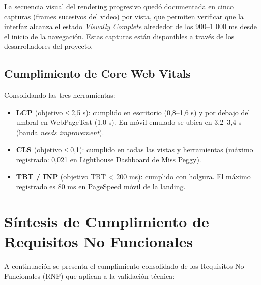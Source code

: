 La secuencia visual del rendering progresivo quedó documentada en cinco capturas (frames sucesivos del video) por vista, que permiten verificar que la interfaz alcanza el estado \emph{Visually Complete} alrededor de los 900--1 000 ms desde el inicio de la navegación. Estas capturas están disponibles a través de los desarrolladores del proyecto.

\subsection{Cumplimiento de Core Web Vitals}\label{cumplimiento-de-core-web-vitals}

Consolidando las tres herramientas:

\begin{itemize}
\tightlist
\item
  \textbf{LCP} (objetivo ≤ 2,5 s): cumplido en escritorio (0,8--1,6 s) y por debajo del umbral en WebPageTest (1,0 s). En móvil emulado se ubica en 3,2--3,4 s (banda \emph{needs improvement}).
\item
  \textbf{CLS} (objetivo ≤ 0,1): cumplido en todas las vistas y herramientas (máximo registrado: 0,021 en Lighthouse Dashboard de Miss Peggy).
\item
  \textbf{TBT / INP} (objetivo TBT \textless{} 200 ms): cumplido con holgura. El máximo registrado es 80 ms en PageSpeed móvil de la landing.
\end{itemize}

\section{Síntesis de Cumplimiento de Requisitos No Funcionales}\label{suxedntesis-de-cumplimiento-de-requisitos-no-funcionales}

A continuación se presenta el cumplimiento consolidado de los Requisitos No Funcionales (RNF) que aplican a la validación técnica:

